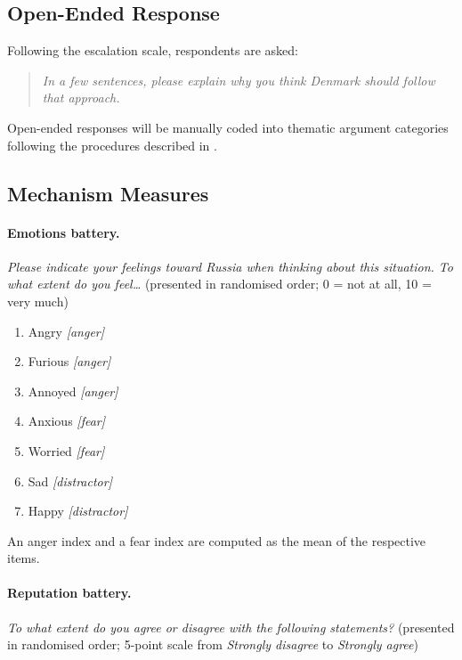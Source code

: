 \subsection{Open-Ended Response}

Following the escalation scale, respondents are asked:

\begin{quote}
\textit{In a few sentences, please explain why you think Denmark should follow that approach.}
\end{quote}

Open-ended responses will be manually coded into thematic argument categories following the procedures described in \textcite{jakob_barrett_how_2026}.

\subsection{Mechanism Measures}

\paragraph{Emotions battery.}
\textit{Please indicate your feelings toward Russia when thinking about this situation. To what extent do you feel\ldots} (presented in randomised order; 0 = not at all, 10 = very much)

\begin{enumerate}
    \item Angry \hfill \textit{[anger]}
    \item Furious \hfill \textit{[anger]}
    \item Annoyed \hfill \textit{[anger]}
    \item Anxious \hfill \textit{[fear]}
    \item Worried \hfill \textit{[fear]}
    \item Sad \hfill \textit{[distractor]}
    \item Happy \hfill \textit{[distractor]}
\end{enumerate}

An anger index and a fear index are computed as the mean of the respective items.

\paragraph{Reputation battery.}
\textit{To what extent do you agree or disagree with the following statements?} (presented in randomised order; 5-point scale from \textit{Strongly disagree} to \textit{Strongly agree})

